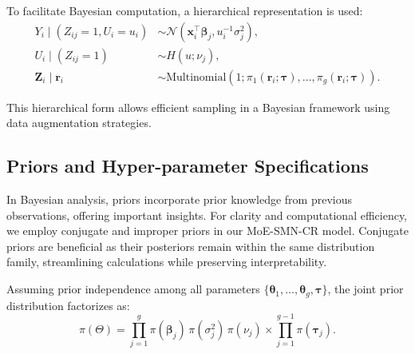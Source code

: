 \documentclass[10.5pt]{article} %
\begin{document}
\noindent
To facilitate Bayesian computation, a hierarchical representation is used:
\[
\begin{aligned}
Y_i \mid (Z_{ij} = 1, U_i = u_i) &\sim \mathcal{N}(\mathbf{x}_i^\top \boldsymbol{\beta}_j, u_i^{-1} \sigma_j^2), \\
U_i \mid (Z_{ij} = 1) &\sim H(u; \nu_j), \\
\mathbf{Z}_i \mid \mathbf{r}_i &\sim \text{Multinomial}(1; \pi_1(\mathbf{r}_i; \boldsymbol{\tau}), \dots, \pi_g(\mathbf{r}_i; \boldsymbol{\tau})).
\end{aligned}
\]

\noindent
This hierarchical form allows efficient sampling in a Bayesian framework using data augmentation strategies.

\subsection{Priors and Hyper-parameter Specifications}

In Bayesian analysis, priors incorporate prior knowledge from previous observations, offering important insights. For clarity and computational efficiency, we employ conjugate and improper priors in our MoE-SMN-CR model. Conjugate priors are beneficial as their posteriors remain within the same distribution family, streamlining calculations while preserving interpretability.

\noindent
Assuming prior independence among all parameters $\{\boldsymbol{\theta}_1, \ldots, \boldsymbol{\theta}_g, \boldsymbol{\tau} \}$, the joint prior distribution factorizes as:
\[
\pi(\Theta) = \prod_{j=1}^{g} \pi(\boldsymbol{\beta}_j)\, \pi(\sigma_j^2)\, \pi(\nu_j) \times \prod_{j=1}^{g-1} \pi(\boldsymbol{\tau}_j).
\]
\end{document}
